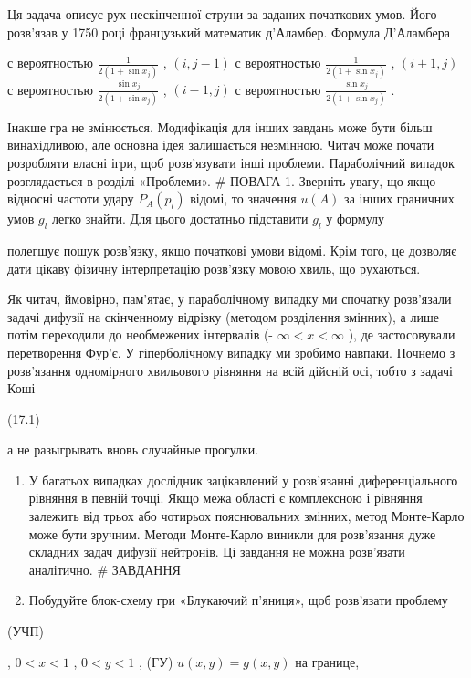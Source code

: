 \documentclass[
  ukrainian,
]{article}
\providecommand{\tightlist}{%
  \setlength{\itemsep}{0pt}\setlength{\parskip}{0pt}}
\begin{document}
Ця задача описує рух нескінченної струни за заданих початкових умов.
Його розв'язав у 1750 році французький математик д'Аламбер. Формула
Д'Аламбера

с вероятностью \(\frac{1}{2(1+\sin x_j)}\) , \((i, j-1)\) с вероятностью
\(\frac{1}{2(1+\sin x_j)}\) , \((i+1, j)\) с вероятностью
\(\frac{\sin x_j}{2(1+\sin x_j)}\) , \((i-1, j)\) с вероятностью
\(\frac{\sin x_j}{2(1+\sin x_j)}\) .

Інакше гра не змінюється. Модифікація для інших завдань може бути більш
винахідливою, але основна ідея залишається незмінною. Читач може почати
розробляти власні ігри, щоб розв'язувати інші проблеми. Параболічний
випадок розглядається в розділі «Проблеми». \# ПОВАГА 1. Зверніть увагу,
що якщо відносні частоти удару \(P_A(p_l)\) відомі, то значення
\(u\left(A\right)\) за інших граничних умов \(g_l\) легко знайти. Для
цього достатньо підставити \(g_l\) у формулу

полегшує пошук розв'язку, якщо початкові умови відомі. Крім того, це
дозволяє дати цікаву фізичну інтерпретацію розв'язку мовою хвиль, що
рухаються.

Як читач, ймовірно, пам'ятає, у параболічному випадку ми спочатку
розв'язали задачі дифузії на скінченному відрізку (методом розділення
змінних), а лише потім переходили до необмежених інтервалів (-
\(\infty < x < \infty\) ), де застосовували перетворення Фур'є. У
гіперболічному випадку ми зробимо навпаки. Почнемо з розв'язання
одномірного хвильового рівняння на всій дійсній осі, тобто з задачі Коші

(17.1)

а не разыгрывать вновь случайные прогулки.

\begin{enumerate}
\def\labelenumi{\arabic{enumi}.}
\setcounter{enumi}{1}
\tightlist
\item
  У багатьох випадках дослідник зацікавлений у розв'язанні
  диференціального рівняння в певній точці. Якщо межа області є
  комплексною і рівняння залежить від трьох або чотирьох пояснювальних
  змінних, метод Монте-Карло може бути зручним. Методи Монте-Карло
  виникли для розв'язання дуже складних задач дифузії нейтронів. Ці
  завдання не можна розв'язати аналітично. \# ЗАВДАННЯ
\item
  Побудуйте блок-схему гри «Блукаючий п'яниця», щоб розв'язати проблему
\end{enumerate}

(УЧП)

, \(0 < x < 1\) , \(0 < y < 1\) , (ГУ) \(u(x, y) = g(x, y)\) на границе,
\end{document}
